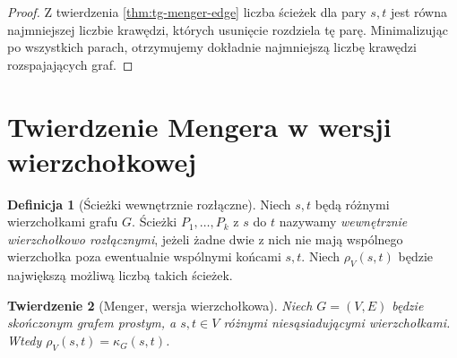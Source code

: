\documentclass[11pt,a4paper]{report}
\numberwithin{equation}{section}
\theoremstyle{plain}
\newtheorem{twierdzenie}{Twierdzenie}[section]
\theoremstyle{definition}
\newtheorem{definicja}[twierdzenie]{Definicja}
\theoremstyle{remark}
\begin{document}
\begin{proof}
Z twierdzenia \ref{thm:tg-menger-edge} liczba ścieżek
dla pary $s,t$ jest równa najmniejszej liczbie krawędzi,
których usunięcie rozdziela tę parę. Minimalizując po
wszystkich parach, otrzymujemy dokładnie najmniejszą
liczbę krawędzi rozspajających graf.
\end{proof}

\section{Twierdzenie Mengera w wersji wierzchołkowej}
\label{sec:tg-menger-vertices}

\begin{definicja}[Ścieżki wewnętrznie rozłączne]
Niech $s,t$ będą różnymi wierzchołkami grafu $G$.
Ścieżki $P_1,\dots,P_k$ z $s$ do $t$ nazywamy
\emph{wewnętrznie wierzchołkowo rozłącznymi}, jeżeli
żadne dwie z nich nie mają wspólnego wierzchołka
poza ewentualnie wspólnymi końcami $s,t$.
Niech $\rho_V(s,t)$ będzie największą możliwą
liczbą takich ścieżek.
\end{definicja}

\begin{twierdzenie}[Menger, wersja wierzchołkowa]
\label{thm:tg-menger-vertex}
Niech $G=(V,E)$ będzie skończonym grafem prostym,
a $s,t\in V$ różnymi \emph{niesąsiadującymi} wierzchołkami.
Wtedy $\rho_V(s,t)=\kappa_G(s,t)$.
\end{twierdzenie}
\end{document}
